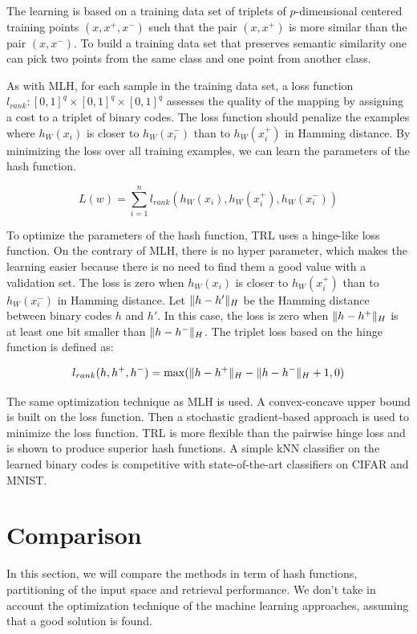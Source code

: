 The learning is based on a training data set of triplets of $p$-dimensional centered training points $(x, x^{+}, x^{-})$ such that the pair $(x, x^{+})$ is more similar than the pair $(x, x^{-})$. To build a training data set that preserves semantic similarity one can pick two points from the same class and one point from another class.

As with MLH, for each sample in the training data set, a loss function $l_{rank}: [0, 1]^{q}\times[0, 1]^{q}\times[0, 1]^{q}$ assesses the quality of the mapping by assigning a cost to a triplet of binary codes. The loss function should penalize the examples where $h_W(x_i)$ is closer to $h_W(x^{-}_i)$ than to $h_W(x^{+}_i)$ in Hamming distance. By minimizing the loss over all training examples, we can learn the parameters of the hash function.

\[L(w)=\sum\limits_{i=1}^n l_{rank}(h_W(x_i), h_W(x^{+}_i), h_W(x^{-}_i))\]

To optimize the parameters of the hash function, TRL uses a hinge-like loss function. On the contrary of MLH, there is no hyper parameter, which makes the learning easier because there is no need to find them a good value with a validation set. The loss is zero when $h_W(x_i)$ is closer to $h_W(x^{+}_i)$ than to $h_W(x^{-}_i)$ in Hamming distance. Let $\lVert h - h'\rVert_{H}$ be the Hamming distance between binary codes $h$ and $h'$. In this case, the loss is zero when $\lVert h - h^{+}\rVert_{H}$ is at least one bit smaller than $\lVert h - h^{-}\rVert_{H}$. The triplet loss based on the hinge function is defined as:

\[
	l_{rank}(h, h^{+}, h^{-})=\max(\lVert h - h^{+}\rVert_{H} - \lVert h - h^{-}\rVert_{H} + 1, 0)
\]

The same optimization technique as MLH is used. A convex-concave upper bound is built on the loss function. Then a stochastic gradient-based approach is used to minimize the loss function. TRL is more flexible than the pairwise hinge loss and is shown to produce superior hash functions. A simple kNN classifier on the learned binary codes is competitive with state-of-the-art classifiers on CIFAR and MNIST.

\section{Comparison}
In this section, we will compare the methods in term of hash functions, partitioning of the input space and retrieval performance. We don't take in account the optimization technique of the machine learning approaches, assuming that a good solution is found. 

